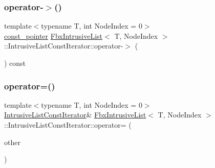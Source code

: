 \mbox{\label{class_fbx_intrusive_list_1_1_intrusive_list_const_iterator_aab8544db3196fab85a8f7b8198fe7c81}} 
\subsubsection{\texorpdfstring{operator-\/$>$()}{operator->()}}
{\footnotesize\ttfamily template$<$typename T, int Node\+Index = 0$>$ \\
\hyperlink{class_fbx_intrusive_list_ae8232fd6a6ef678e5d5eed6ad978994c}{const\+\_\+pointer} \hyperlink{class_fbx_intrusive_list}{Fbx\+Intrusive\+List}$<$ T, Node\+Index $>$\+::Intrusive\+List\+Const\+Iterator\+::operator-\/$>$ (\begin{DoxyParamCaption}{ }\end{DoxyParamCaption}) const}

\mbox{\label{class_fbx_intrusive_list_1_1_intrusive_list_const_iterator_af7448cbf7d925b7fabc3271340cc3c91}} 
\subsubsection{\texorpdfstring{operator=()}{operator=()}}
{\footnotesize\ttfamily template$<$typename T, int Node\+Index = 0$>$ \\
\hyperlink{class_fbx_intrusive_list_1_1_intrusive_list_const_iterator}{Intrusive\+List\+Const\+Iterator}\& \hyperlink{class_fbx_intrusive_list}{Fbx\+Intrusive\+List}$<$ T, Node\+Index $>$\+::Intrusive\+List\+Const\+Iterator\+::operator= (\begin{DoxyParamCaption}\item[{const \hyperlink{class_fbx_intrusive_list_1_1_intrusive_list_const_iterator}{Intrusive\+List\+Const\+Iterator} \&}]{other }\end{DoxyParamCaption})}

